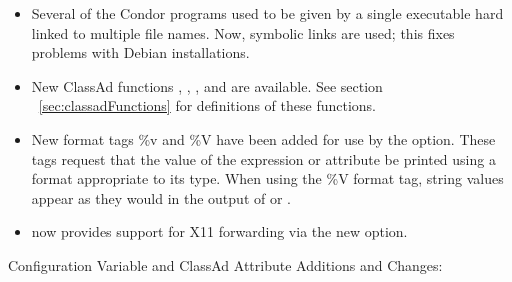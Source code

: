 \begin{itemize}
\item Several of the Condor programs used to be given by a single executable
hard linked to multiple file names. 
Now, symbolic links are used; this fixes problems with Debian installations.

\item New ClassAd functions , ,
, and  are available.
See section ~\ref{sec:classadFunctions} for definitions of these functions.

\item New format tags \%v and \%V have been added for use by the
  option.
These tags request that the value of the expression or attribute be printed 
using a format appropriate to its type.
When using the \%V format tag, string values appear as they would in
the output of  or .

\item {} now provides support for X11 forwarding
via the new  option.

\end{itemize}

\noindent Configuration Variable and ClassAd Attribute Additions and Changes:

